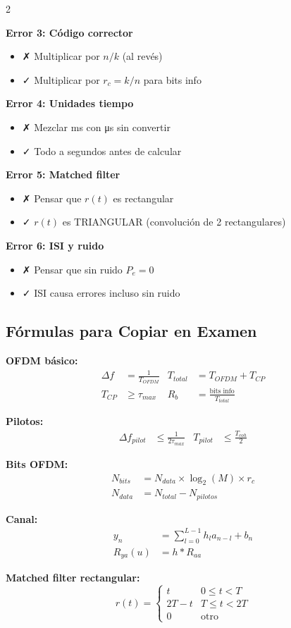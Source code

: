 \documentclass[10pt,a4paper]{article}
\begin{document}
\begin{multicols}{2}
\begin{tcolorbox}[colback=rojoclaro!10,colframe=rojoclaro!70!black,title=¡CUIDADO!]
\textbf{Error 3: Código corrector}
\begin{itemize}
\item ✗ Multiplicar por $n/k$ (al revés)
\item ✓ Multiplicar por $r_c = k/n$ para bits info
\end{itemize}

\textbf{Error 4: Unidades tiempo}
\begin{itemize}
\item ✗ Mezclar ms con μs sin convertir
\item ✓ Todo a segundos antes de calcular
\end{itemize}

\textbf{Error 5: Matched filter}
\begin{itemize}
\item ✗ Pensar que $r(t)$ es rectangular
\item ✓ $r(t)$ es TRIANGULAR (convolución de 2 rectangulares)
\end{itemize}

\textbf{Error 6: ISI y ruido}
\begin{itemize}
\item ✗ Pensar que sin ruido $P_e = 0$
\item ✓ ISI causa errores incluso sin ruido
\end{itemize}

\end{tcolorbox}

\subsection{Fórmulas para Copiar en Examen}

\textbf{OFDM básico:}
\begin{align*}
\Delta f &= \frac{1}{T_{OFDM}} & T_{total} &= T_{OFDM} + T_{CP}\\
T_{CP} &\geq \tau_{max} & R_b &= \frac{\text{bits info}}{T_{total}}
\end{align*}

\textbf{Pilotos:}
\begin{align*}
\Delta f_{pilot} &\leq \frac{1}{2\tau_{max}} & T_{pilot} &\leq \frac{T_{coh}}{2}
\end{align*}

\textbf{Bits OFDM:}
\begin{align*}
N_{bits} &= N_{data} \times \log_2(M) \times r_c\\
N_{data} &= N_{total} - N_{pilotos}
\end{align*}

\textbf{Canal:}
\begin{align*}
y_n &= \sum_{l=0}^{L-1} h_l a_{n-l} + b_n\\
R_{ya}(u) &= h * R_{aa}
\end{align*}

\textbf{Matched filter rectangular:}
$$r(t) = \begin{cases}
t & 0 \leq t < T\\
2T-t & T \leq t < 2T\\
0 & \text{otro}
\end{cases}$$

\end{multicols}
\end{document}

